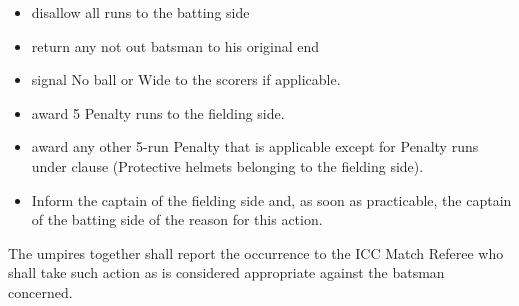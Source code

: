 \documentclass[12pt]{article}
\begin{document}
\vspace{\baselineskip}
\begin{itemize}
	\item {\fontsize{9pt}{10.8pt}\selectfont disallow all runs to the batting side\par}\par


\vspace{\baselineskip}
	\item {\fontsize{9pt}{10.8pt}\selectfont return any not out batsman to his original end\par}\par


\vspace{\baselineskip}
	\item {\fontsize{9pt}{10.8pt}\selectfont signal No ball or Wide to the scorers if applicable.\par}\par


\vspace{\baselineskip}
	\item {\fontsize{9pt}{10.8pt}\selectfont award 5 Penalty runs to the fielding side.\par}\par


\vspace{\baselineskip}
	\item {\fontsize{9pt}{10.8pt}\selectfont award any other 5-run Penalty that is applicable except for Penalty runs under clause (Protective helmets belonging to the fielding side).\par}\par


\vspace{\baselineskip}
	\item {\fontsize{9pt}{10.8pt}\selectfont Inform the captain of the fielding side and, as soon as practicable, the captain of the batting side of the reason for this action.\par}
\end{itemize}\par


\vspace{\baselineskip}
\begin{adjustwidth}{0.5in}{0.06in}
{\fontsize{9pt}{10.8pt}\selectfont The umpires together shall report the occurrence to the ICC Match Referee who shall take such action as is considered appropriate against the batsman concerned.\par}\par

\end{adjustwidth}
\end{document}
